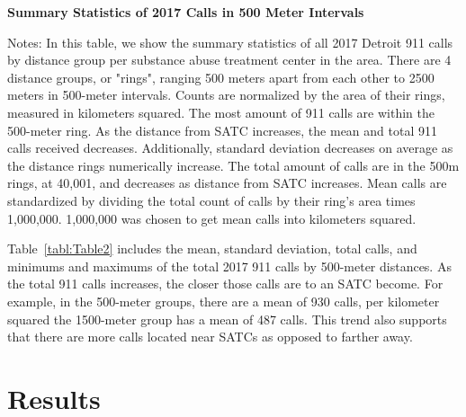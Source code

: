 \documentclass[12pt]{article}
\begin{document}
\begin{table}[hb!]
\centering
\scalebox{0.8}{
\centering

}
\caption{\textbf{Summary Statistics of 2017 Calls in 500 Meter Intervals}}
\label{tabl:Table2}
\centering\small{Notes: In this table, we show the summary statistics of all 2017 Detroit 911 calls by distance group per substance abuse treatment center in the area. There are 4 distance groups, or "rings", ranging 500 meters apart from each other to 2500 meters in 500-meter intervals. Counts are normalized by the area of their rings, measured in kilometers squared. The most amount of 911 calls are within the 500-meter ring. As the distance from SATC increases, the mean and total 911 calls received decreases. Additionally, standard deviation decreases on average as the distance rings numerically increase. The total amount of calls are in the 500m rings, at 40,001, and decreases as distance from SATC increases. Mean calls are standardized by dividing the total count of calls by their ring's area times 1,000,000. 1,000,000 was chosen to get mean calls into kilometers squared. }
\end{table}

Table~\ref{tabl:Table2} includes the mean, standard deviation, total calls, and minimums and maximums of the total 2017 911 calls by 500-meter distances. As the total 911 calls increases, the closer those calls are to an SATC become. For example, in the 500-meter groups, there are a mean of 930 calls, per kilometer squared the 1500-meter group has a mean of 487 calls. This trend also supports that there are more calls located near SATCs as opposed to farther away. 



\section{Results}
\label{sec:result}
\end{document}
